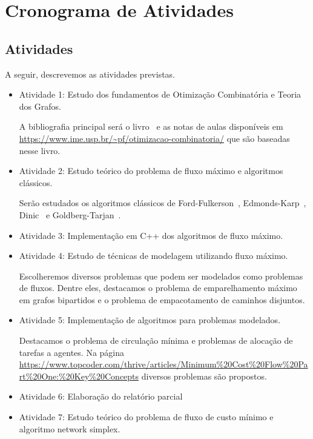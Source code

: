 \documentclass{amsart}
\begin{document}
\section{Cronograma de Atividades}
\subsection{Atividades}
\label{sec:ativ}
A seguir, descrevemos as atividades previstas.
\begin{itemize}
    \item Atividade 1: Estudo dos fundamentos de Otimização Combinatória e Teoria dos Grafos.

    A bibliografia principal será o livro~\cite{cook1998combinatorial} e as notas de aulas disponíveis em \url{https://www.ime.usp.br/~pf/otimizacao-combinatoria/} que são baseadas nesse livro.

    \item Atividade 2: Estudo teórico do problema de fluxo máximo e algoritmos clássicos.

    Serão estudados os algoritmos clássicos de Ford-Fulkerson~\cite{ford1956maximal},
    Edmonds-Karp~\cite{edmonds1972theoretical}, Dinic~\cite{dinic1970algorithm} e Goldberg-Tarjan~\cite{goldberg1988new}.

    \item Atividade 3: Implementação em C++ dos algoritmos de fluxo máximo.

    \item Atividade 4: Estudo de técnicas de modelagem utilizando fluxo máximo.

    Escolheremos diversos problemas que podem ser  modelados como problemas de fluxos. Dentre eles, destacamos o problema de emparelhamento máximo em grafos bipartidos e o problema de empacotamento de caminhos disjuntos.

    \item Atividade 5: Implementação de algoritmos para problemas modelados.

    Destacamos o problema de circulação mínima e problemas de alocação de tarefas a agentes. Na página \url{https://www.topcoder.com/thrive/articles/Minimum%20Cost%20Flow%20Part%20One:%20Key%20Concepts} diversos problemas são propostos.

    \item Atividade 6: Elaboração do relatório parcial

    \item Atividade 7: Estudo teórico do problema de fluxo de custo mínimo e algoritmo network simplex.


\end{itemize}
\end{document}
